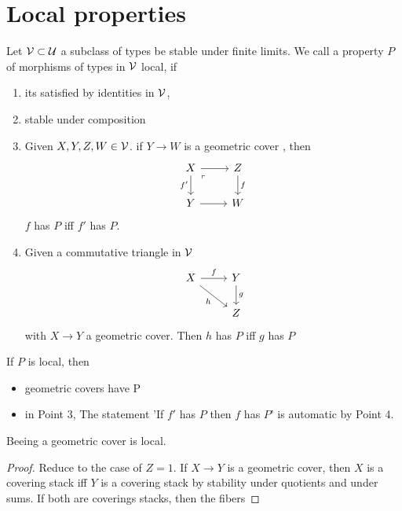 \section{Local properties}

\begin{definition}
	Let $\mathcal{V} \subset \mathcal{U}$ a subclass of types be stable under finite limits. 
	We call a property $P$ of morphisms of types in $\mathcal{V}$ local, if 
	\begin{enumerate}
		\item its satisfied by identities in $\mathcal{V}$,
		\item stable under composition 
		\item Given $X,Y,Z,W \in \mathcal{V}$. if $Y \to W$ is a geometric cover , then 
		\[\begin{tikzcd}
			X & Z \\
			Y & W
			\arrow[from=1-1, to=1-2]
			\arrow["{f'}"', from=1-1, to=2-1]
			\arrow["\ulcorner"{anchor=center, pos=0.125}, draw=none, from=1-1, to=2-2]
			\arrow["f", from=1-2, to=2-2]
			\arrow[from=2-1, to=2-2]
		\end{tikzcd}\]
		$f$ has $P$ iff $f'$ has $P$.
		\item
		Given a commutative triangle in $\mathcal{V}$%
		\[\begin{tikzcd}
			X & Y \\
			& Z
			\arrow["f", from=1-1, to=1-2]
			\arrow["h"', from=1-1, to=2-2]
			\arrow["g", from=1-2, to=2-2]
		\end{tikzcd}\]
		with $X \to Y$ a geometric cover. Then $h$ has $P$ iff $g$ has $P$
	\end{enumerate}
	\begin{lemma}{\label{lemma:local}}
		If $P$ is local, then 
		\begin{itemize}
			\item geometric covers have P
			\item in Point 3, The statement 'If $f'$ has $P$ then $f$ has $P$' is automatic by Point 4.
		\end{itemize}
	\end{lemma}
\end{definition}
\begin{lemma}
	Beeing a geometric cover is local.
\end{lemma}
\begin{proof}
	Reduce to the case of $Z = 1$. If $X \to Y$ is a geometric cover, then $X$ is a covering stack iff $Y$ is a covering stack by stability under quotients and under sums. If both are coverings stacks, then the fibers 
\end{proof}

